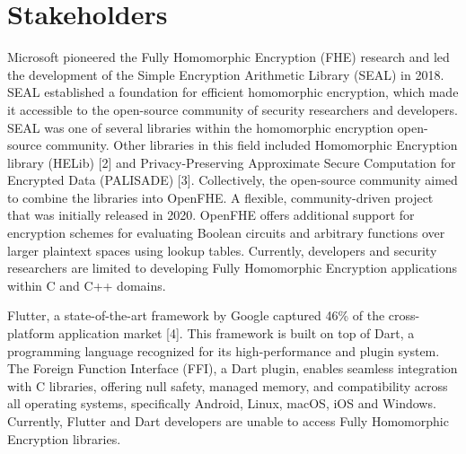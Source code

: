 \section{Stakeholders}
Microsoft pioneered the Fully Homomorphic Encryption (FHE) research and led the development of the Simple Encryption Arithmetic Library (SEAL) in 2018. SEAL established a foundation for efficient homomorphic encryption, which made it accessible to the open-source community of security researchers and developers. SEAL was one of several libraries within the homomorphic encryption open-source community. Other libraries in this field included Homomorphic Encryption library (HELib) [2] and Privacy-Preserving Approximate Secure Computation for Encrypted Data (PALISADE) [3]. Collectively, the open-source community aimed to combine the libraries into OpenFHE. A flexible, community-driven project that was initially released in 2020. OpenFHE offers additional support for encryption schemes for evaluating Boolean circuits and arbitrary functions over larger plaintext spaces using lookup tables. Currently, developers and security researchers are limited to developing Fully Homomorphic Encryption applications within C and C++ domains.

Flutter, a state-of-the-art framework by Google captured 46\% of the cross-platform application market [4]. This framework is built on top of Dart, a programming language recognized for its high-performance and plugin system. The Foreign Function Interface (FFI), a Dart plugin, enables seamless integration with C libraries, offering null safety, managed memory, and compatibility across all operating systems, specifically Android, Linux, macOS, iOS and Windows. Currently, Flutter and Dart developers are unable to access Fully Homomorphic Encryption libraries.